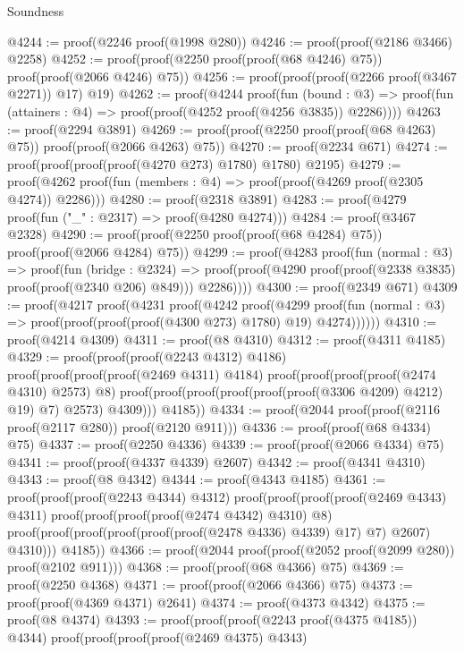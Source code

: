 \begin{lexlean}{Soundness}
\begin{coremodule}
@4244 := proof(@2246 proof(@1998 @280))
@4246 := proof(proof(@2186 @3466) @2258)
@4252 := proof(proof(@2250 proof(proof(@68 @4246) @75)) proof(proof(@2066 @4246) @75))
@4256 := proof(proof(proof(@2266 proof(@3467 @2271)) @17) @19)
@4262 := proof(@4244
      proof(fun (bound : @3) =>
        proof(fun (attainers : @4) => proof(proof(@4252 proof(@4256 @3835)) @2286))))
@4263 := proof(@2294 @3891)
@4269 := proof(proof(@2250 proof(proof(@68 @4263) @75)) proof(proof(@2066 @4263) @75))
@4270 := proof(@2234 @671)
@4274 := proof(proof(proof(proof(@4270 @273) @1780) @1780) @2195)
@4279 := proof(@4262 proof(fun (members : @4) => proof(proof(@4269 proof(@2305 @4274)) @2286)))
@4280 := proof(@2318 @3891)
@4283 := proof(@4279 proof(fun ("_" : @2317) => proof(@4280 @4274)))
@4284 := proof(@3467 @2328)
@4290 := proof(proof(@2250 proof(proof(@68 @4284) @75)) proof(proof(@2066 @4284) @75))
@4299 := proof(@4283
      proof(fun (normal : @3) =>
        proof(fun (bridge : @2324) =>
          proof(proof(@4290 proof(proof(@2338 @3835) proof(proof(@2340 @206) @849))) @2286))))
@4300 := proof(@2349 @671)
@4309 := proof(@4217
      proof(@4231
          proof(@4242
              proof(@4299
                  proof(fun (normal : @3) =>
                    proof(proof(proof(proof(@4300 @273) @1780) @19) @4274))))))
@4310 := proof(@4214 @4309)
@4311 := proof(@8 @4310)
@4312 := proof(@4311 @4185)
@4329 := proof(proof(proof(@2243 @4312) @4186)
      proof(proof(proof(proof(@2469 @4311) @4184)
            proof(proof(proof(proof(@2474 @4310) @2573) @8)
                proof(proof(proof(proof(proof(proof(@3306 @4209) @4212) @19) @7) @2573) @4309)))
          @4185))
@4334 := proof(@2044 proof(proof(@2116 proof(@2117 @280)) proof(@2120 @911)))
@4336 := proof(proof(@68 @4334) @75)
@4337 := proof(@2250 @4336)
@4339 := proof(proof(@2066 @4334) @75)
@4341 := proof(proof(@4337 @4339) @2607)
@4342 := proof(@4341 @4310)
@4343 := proof(@8 @4342)
@4344 := proof(@4343 @4185)
@4361 := proof(proof(proof(@2243 @4344) @4312)
      proof(proof(proof(proof(@2469 @4343) @4311)
            proof(proof(proof(proof(@2474 @4342) @4310) @8)
                proof(proof(proof(proof(proof(proof(@2478 @4336) @4339) @17) @7) @2607) @4310)))
          @4185))
@4366 := proof(@2044 proof(proof(@2052 proof(@2099 @280)) proof(@2102 @911)))
@4368 := proof(proof(@68 @4366) @75)
@4369 := proof(@2250 @4368)
@4371 := proof(proof(@2066 @4366) @75)
@4373 := proof(proof(@4369 @4371) @2641)
@4374 := proof(@4373 @4342)
@4375 := proof(@8 @4374)
@4393 := proof(proof(proof(@2243 proof(@4375 @4185)) @4344)
      proof(proof(proof(proof(@2469 @4375) @4343)

\end{coremodule}
\end{lexlean}
